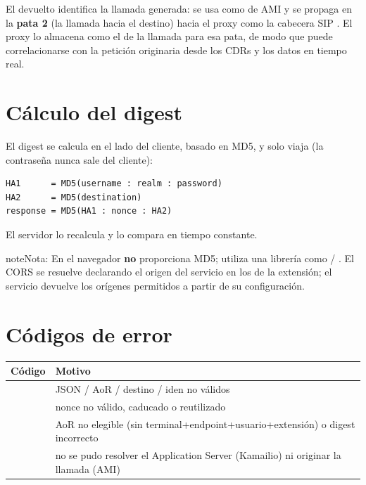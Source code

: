 \documentclass[letterpaper,10pt,spanish]{sphinxmanual}
\begin{document}
El  devuelto identifica la llamada generada: se usa como  de AMI y se propaga en la \textbf{pata 2} (la llamada hacia el destino) hacia el proxy como la cabecera SIP . El proxy lo almacena como el  de la llamada para esa pata, de modo que puede correlacionarse con la petición  originaria desde los CDRs y los datos en tiempo real.


\section{Cálculo del digest}
\label{api_rest/click2call:digest-computation}
El digest se calcula en el lado del cliente, basado en MD5, y solo viaja  (la contraseña nunca sale del cliente):

\begin{Verbatim}[commandchars=\\\{\}]
HA1      = MD5(username : realm : password)
HA2      = MD5(destination)
response = MD5(HA1 : nonce : HA2)
\end{Verbatim}

El servidor lo recalcula y lo compara en tiempo constante.

\begin{notice}{note}{Nota:}
En el navegador  \textbf{no} proporciona MD5; utiliza una librería como  / . El CORS se resuelve declarando el origen del servicio en los  de la extensión; el servicio devuelve los orígenes permitidos a partir de su configuración.
\end{notice}


\section{Códigos de error}
\label{api_rest/click2call:error-codes}
\noindent\begin{tabulary}{\linewidth}{|L|L|}
\hline
\textsf{\relax 
Código
\unskip}\relax &\textsf{\relax 
Motivo
\unskip}\relax \\
\hline
{}
&
JSON / AoR / destino / iden no válidos
\\
\hline
{}
&
nonce no válido, caducado o reutilizado
\\
\hline
{}
&
AoR no elegible (sin terminal+endpoint+usuario+extensión) o digest incorrecto
\\
\hline
{}
&
no se pudo resolver el Application Server (Kamailio) ni originar la llamada (AMI)
\\
\hline\end{tabulary}
\end{document}
